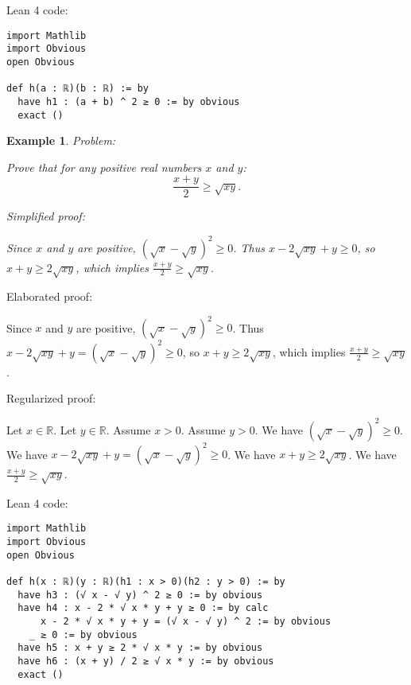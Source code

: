 \documentclass{article}
\newtheorem{example}{Example}
\begin{document}
Lean 4 code:
\begin{tcolorbox}[colback=white!10, width=\linewidth]
\begin{lstlisting}[language=Lean4]
import Mathlib
import Obvious
open Obvious

def h(a : ℝ)(b : ℝ) := by
  have h1 : (a + b) ^ 2 ≥ 0 := by obvious
  exact ()

\end{lstlisting}
\end{tcolorbox}


\begin{example}
Problem:
\begin{tcolorbox}[colback=yellow!10, width=\linewidth]
Prove that for any positive real numbers $x$ and $y$:
    $$\frac{x+y}{2} \geq \sqrt{xy}.$$
\end{tcolorbox}

Simplified proof:
\begin{tcolorbox}[colback=blue!10, width=\linewidth]
Since $x$ and $y$ are positive, $(\sqrt{x} - \sqrt{y})^2 \ge 0$. Thus $x - 2\sqrt{xy} + y \ge 0$, so $x+y \ge 2\sqrt{xy}$, which implies $\frac{x+y}{2} \ge \sqrt{xy}$.
\end{tcolorbox}
\end{example}

Elaborated proof:
\begin{tcolorbox}[colback=green!10, width=\linewidth]
Since $x$ and $y$ are positive, $(\sqrt{x} - \sqrt{y})^2 \ge 0$. Thus $x - 2\sqrt{xy} + y = (\sqrt{x} - \sqrt{y})^2 \ge 0$, so $x+y \ge 2\sqrt{xy}$, which implies $\frac{x+y}{2} \ge \sqrt{xy}$.
\end{tcolorbox}

Regularized proof:
\begin{tcolorbox}[colback=red!10, width=\linewidth]
Let $x\in\mathbb{R}$.
Let $y\in\mathbb{R}$.
Assume $x > 0$.
Assume $y > 0$.
We have ${(\sqrt{x} - \sqrt{y})}^2 \ge 0$.
We have $x - 2\sqrt{xy} + y = {(\sqrt{x} - \sqrt{y})}^2 \ge 0$.
We have $x+y \ge 2\sqrt{xy}$.
We have $\frac{x+y}{2} \ge \sqrt{xy}$.
\end{tcolorbox}

Lean 4 code:
\begin{tcolorbox}[colback=white!10, width=\linewidth]
\begin{lstlisting}[language=Lean4]
import Mathlib
import Obvious
open Obvious

def h(x : ℝ)(y : ℝ)(h1 : x > 0)(h2 : y > 0) := by
  have h3 : (√ x - √ y) ^ 2 ≥ 0 := by obvious
  have h4 : x - 2 * √ x * y + y ≥ 0 := by calc
      x - 2 * √ x * y + y = (√ x - √ y) ^ 2 := by obvious
    _ ≥ 0 := by obvious
  have h5 : x + y ≥ 2 * √ x * y := by obvious
  have h6 : (x + y) / 2 ≥ √ x * y := by obvious
  exact ()

\end{lstlisting}
\end{tcolorbox}
\end{document}
